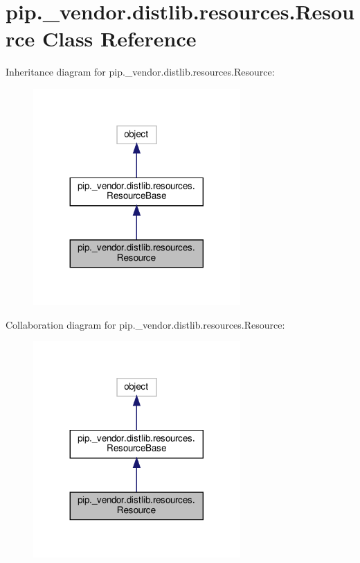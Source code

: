 \hypertarget{classpip_1_1__vendor_1_1distlib_1_1resources_1_1Resource}{}\section{pip.\+\_\+vendor.\+distlib.\+resources.\+Resource Class Reference}
\label{classpip_1_1__vendor_1_1distlib_1_1resources_1_1Resource}


Inheritance diagram for pip.\+\_\+vendor.\+distlib.\+resources.\+Resource\+:
\nopagebreak
\begin{figure}[H]
\begin{center}
\leavevmode
\includegraphics[width=224pt]{classpip_1_1__vendor_1_1distlib_1_1resources_1_1Resource__inherit__graph}
\end{center}
\end{figure}


Collaboration diagram for pip.\+\_\+vendor.\+distlib.\+resources.\+Resource\+:
\nopagebreak
\begin{figure}[H]
\begin{center}
\leavevmode
\includegraphics[width=224pt]{classpip_1_1__vendor_1_1distlib_1_1resources_1_1Resource__coll__graph}
\end{center}
\end{figure}
